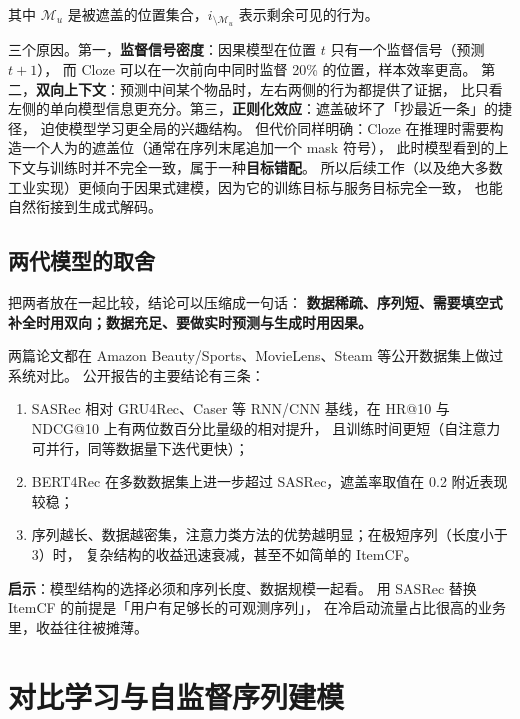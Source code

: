 其中 $\mathcal{M}_u$ 是被遮盖的位置集合，$i_{\setminus \mathcal{M}_u}$ 表示剩余可见的行为。

\begin{insight}
三个原因。第一，\textbf{监督信号密度}：因果模型在位置 $t$ 只有一个监督信号（预测 $t+1$），
而 Cloze 可以在一次前向中同时监督 20\% 的位置，样本效率更高。
第二，\textbf{双向上下文}：预测中间某个物品时，左右两侧的行为都提供了证据，
比只看左侧的单向模型信息更充分。第三，\textbf{正则化效应}：遮盖破坏了「抄最近一条」的捷径，
迫使模型学习更全局的兴趣结构。
但代价同样明确：Cloze 在推理时需要构造一个人为的遮盖位（通常在序列末尾追加一个 mask 符号），
此时模型看到的上下文与训练时并不完全一致，属于一种\textbf{目标错配}。
所以后续工作（以及绝大多数工业实现）更倾向于因果式建模，因为它的训练目标与服务目标完全一致，
也能自然衔接到生成式解码。
\end{insight}

\subsection{两代模型的取舍}

把两者放在一起比较，结论可以压缩成一句话：
\textbf{数据稀疏、序列短、需要填空式补全时用双向；数据充足、要做实时预测与生成时用因果。}

\begin{casebox}
两篇论文都在 Amazon Beauty/Sports、MovieLens、Steam 等公开数据集上做过系统对比。
公开报告的主要结论有三条：
\begin{enumerate}
  \item SASRec 相对 GRU4Rec、Caser 等 RNN/CNN 基线，在 HR@10 与 NDCG@10 上有两位数百分比量级的相对提升，
        且训练时间更短（自注意力可并行，同等数据量下迭代更快）；
  \item BERT4Rec 在多数数据集上进一步超过 SASRec，遮盖率取值在 0.2 附近表现较稳；
  \item 序列越长、数据越密集，注意力类方法的优势越明显；在极短序列（长度小于 3）时，
        复杂结构的收益迅速衰减，甚至不如简单的 ItemCF。
\end{enumerate}
\textbf{启示}：模型结构的选择必须和序列长度、数据规模一起看。
用 SASRec 替换 ItemCF 的前提是「用户有足够长的可观测序列」，
在冷启动流量占比很高的业务里，收益往往被摊薄。
\end{casebox}

\section{对比学习与自监督序列建模}

